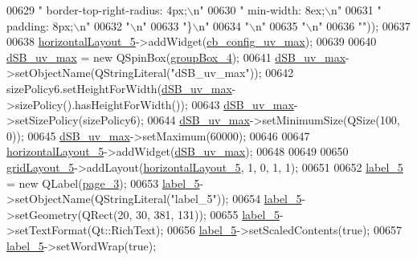 \begin{DoxyCode}
00629 \textcolor{stringliteral}{"     border-top-right-radius: 4px;\(\backslash\)n"}
00630 \textcolor{stringliteral}{"     min-width: 8ex;\(\backslash\)n"}
00631 \textcolor{stringliteral}{"     padding: 8px;\(\backslash\)n"}
00632 \textcolor{stringliteral}{"\(\backslash\)n"}
00633 \textcolor{stringliteral}{"\}\(\backslash\)n"}
00634 \textcolor{stringliteral}{"\(\backslash\)n"}
00635 \textcolor{stringliteral}{"\(\backslash\)n"}
00636 \textcolor{stringliteral}{""}));
00637 
00638         \hyperlink{a00027_a14c9d4842c3e97e16e7873ef0aecdb1e}{horizontalLayout\_5}->addWidget(\hyperlink{a00027_a13ce5fddc83683d7b8b717f0b9a4e2cf}{cb\_config\_uv\_max});
00639 
00640         \hyperlink{a00027_aa2872ada374dace81c4f1cc41d8e244d}{dSB\_uv\_max} = \textcolor{keyword}{new} QSpinBox(\hyperlink{a00027_ad8a919e5634add9c41bfc319cb9fd338}{groupBox\_4});
00641         \hyperlink{a00027_aa2872ada374dace81c4f1cc41d8e244d}{dSB\_uv\_max}->setObjectName(QStringLiteral(\textcolor{stringliteral}{"dSB\_uv\_max"}));
00642         sizePolicy6.setHeightForWidth(\hyperlink{a00027_aa2872ada374dace81c4f1cc41d8e244d}{dSB\_uv\_max}->sizePolicy().hasHeightForWidth());
00643         \hyperlink{a00027_aa2872ada374dace81c4f1cc41d8e244d}{dSB\_uv\_max}->setSizePolicy(sizePolicy6);
00644         \hyperlink{a00027_aa2872ada374dace81c4f1cc41d8e244d}{dSB\_uv\_max}->setMinimumSize(QSize(100, 0));
00645         \hyperlink{a00027_aa2872ada374dace81c4f1cc41d8e244d}{dSB\_uv\_max}->setMaximum(60000);
00646 
00647         \hyperlink{a00027_a14c9d4842c3e97e16e7873ef0aecdb1e}{horizontalLayout\_5}->addWidget(\hyperlink{a00027_aa2872ada374dace81c4f1cc41d8e244d}{dSB\_uv\_max});
00648 
00649 
00650         \hyperlink{a00027_a8731b71c513ff94baf59614807823c5d}{gridLayout\_5}->addLayout(\hyperlink{a00027_a14c9d4842c3e97e16e7873ef0aecdb1e}{horizontalLayout\_5}, 1, 0, 1, 1);
00651 
00652         \hyperlink{a00027_ad6bab8fb8903b8f41afea1218ee52695}{label\_5} = \textcolor{keyword}{new} QLabel(\hyperlink{a00027_ac682cb2a9b686ca7c3d29771ad9ccb48}{page\_3});
00653         \hyperlink{a00027_ad6bab8fb8903b8f41afea1218ee52695}{label\_5}->setObjectName(QStringLiteral(\textcolor{stringliteral}{"label\_5"}));
00654         \hyperlink{a00027_ad6bab8fb8903b8f41afea1218ee52695}{label\_5}->setGeometry(QRect(20, 30, 381, 131));
00655         \hyperlink{a00027_ad6bab8fb8903b8f41afea1218ee52695}{label\_5}->setTextFormat(Qt::RichText);
00656         \hyperlink{a00027_ad6bab8fb8903b8f41afea1218ee52695}{label\_5}->setScaledContents(\textcolor{keyword}{true});
00657         \hyperlink{a00027_ad6bab8fb8903b8f41afea1218ee52695}{label\_5}->setWordWrap(\textcolor{keyword}{true});

\end{DoxyCode}
